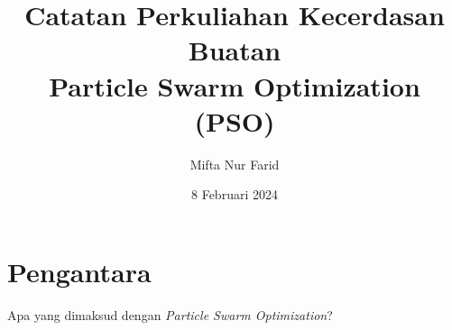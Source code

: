 \documentclass[10pt,a4paper]{article}
\title{Catatan Perkuliahan Kecerdasan Buatan\\Particle Swarm Optimization (PSO)}
\author{Mifta Nur Farid}
\date{8 Februari 2024}
\begin{document}
	\maketitle
	\section{Pengantara}
	Apa yang dimaksud dengan \emph{Particle Swarm Optimization}?
\end{document}

